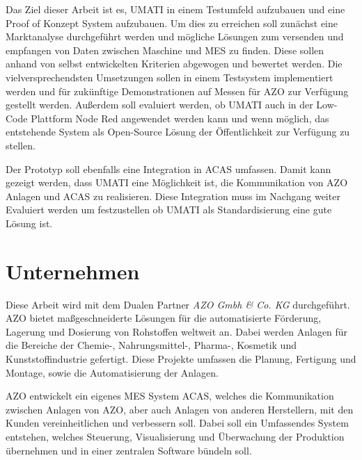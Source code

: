 \documentclass[a4paper, 12pt, oneside]{scrbook}
\begin{document}
	\noindent Das Ziel dieser Arbeit ist es, UMATI in einem Testumfeld aufzubauen und eine Proof of Konzept System aufzubauen. Um dies zu erreichen soll zunächst eine Marktanalyse durchgeführt werden und mögliche Lösungen zum versenden und empfangen von Daten zwischen Maschine und MES zu finden. Diese sollen anhand von selbst entwickelten Kriterien abgewogen und bewertet werden. Die vielversprechendsten Umsetzungen sollen in einem Testsystem implementiert werden und für zukünftige Demonstrationen auf Messen für AZO zur Verfügung gestellt werden. Außerdem soll evaluiert werden, ob UMATI auch in der Low-Code Plattform Node Red angewendet werden kann und wenn möglich, das entstehende System als Open-Source Lösung der Öffentlichkeit zur Verfügung zu stellen.
	
	\noindent Der Prototyp soll ebenfalls eine Integration in ACAS umfassen. Damit kann gezeigt werden, dass UMATI eine Möglichkeit ist, die Kommunikation von AZO Anlagen und ACAS zu realisieren. Diese Integration muss im Nachgang weiter Evaluiert werden um festzustellen ob UMATI als Standardisierung eine gute Lösung ist.
	
	
	
	
	
	\section{Unternehmen}
	
	
	\noindent Diese Arbeit wird mit dem Dualen Partner \textit{AZO Gmbh \& Co. KG} durchgeführt. AZO bietet maßgeschneiderte Lösungen für die automatisierte Förderung, Lagerung und Dosierung von Rohstoffen weltweit an. Dabei werden Anlagen für die Bereiche der Chemie-, Nahrungsmittel-, Pharma-, Kosmetik und Kunststoffindustrie gefertigt. Diese Projekte umfassen die Planung, Fertigung und Montage, sowie die Automatisierung der Anlagen.
	
	\noindent AZO entwickelt ein eigenes MES System ACAS, welches die Kommunikation zwischen Anlagen von AZO, aber auch Anlagen von anderen Herstellern, mit den Kunden vereinheitlichen und verbessern soll. Dabei soll ein Umfassendes System entstehen, welches Steuerung, Visualisierung und Überwachung der Produktion übernehmen und in einer zentralen Software bündeln soll.
	
\end{document}
